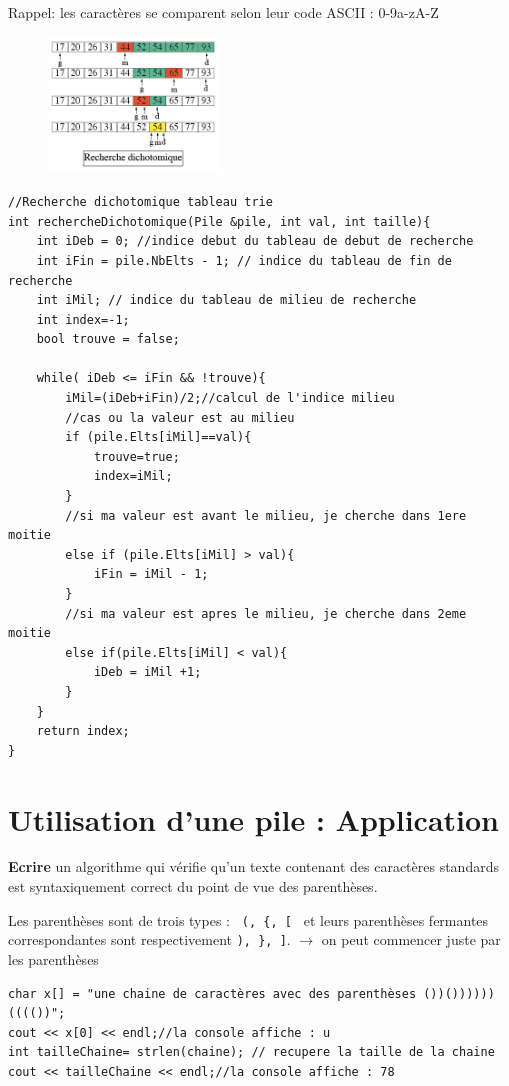 \documentclass[french]{article}
\begin{document}
Rappel: les caractères se comparent selon leur code ASCII : 0-9a-zA-Z 
\begin{figure}[h]
		\centering
		\includegraphics[width=0.4\textwidth]{dicho.jpg}
	\end{figure}
	\begin{lstlisting}[caption={Recherche dichotomique tableau trie}]
//Recherche dichotomique tableau trie
int rechercheDichotomique(Pile &pile, int val, int taille){
    int iDeb = 0; //indice debut du tableau de debut de recherche
    int iFin = pile.NbElts - 1; // indice du tableau de fin de recherche
    int iMil; // indice du tableau de milieu de recherche
    int index=-1;
    bool trouve = false;
    
    while( iDeb <= iFin && !trouve){
        iMil=(iDeb+iFin)/2;//calcul de l'indice milieu
        //cas ou la valeur est au milieu
        if (pile.Elts[iMil]==val){
            trouve=true;
            index=iMil;
        }
        //si ma valeur est avant le milieu, je cherche dans 1ere moitie
        else if (pile.Elts[iMil] > val){
            iFin = iMil - 1;
        }
        //si ma valeur est apres le milieu, je cherche dans 2eme moitie
        else if(pile.Elts[iMil] < val){
            iDeb = iMil +1;
        }
    }
    return index;
}
    \end{lstlisting}
\section{Utilisation d’une pile : Application}
\textbf{Ecrire} un algorithme qui vérifie qu’un texte contenant des caractères standards est syntaxiquement correct du point de vue des parenthèses.

Les parenthèses sont de trois types : \texttt{ (, \{, [ } et leurs parenthèses fermantes correspondantes sont respectivement \texttt{), \}, ]}.
$\rightarrow$ on peut commencer juste par les parenthèses
\begin{lstlisting}[caption={Rappel : Déclaration d'une chaîne de caractères},label=stringrappel]
char x[] = "une chaine de caractères avec des parenthèses ())())))))(((())";
cout << x[0] << endl;//la console affiche : u
int tailleChaine= strlen(chaine); // recupere la taille de la chaine
cout << tailleChaine << endl;//la console affiche : 78
\end{lstlisting}
\end{document}
